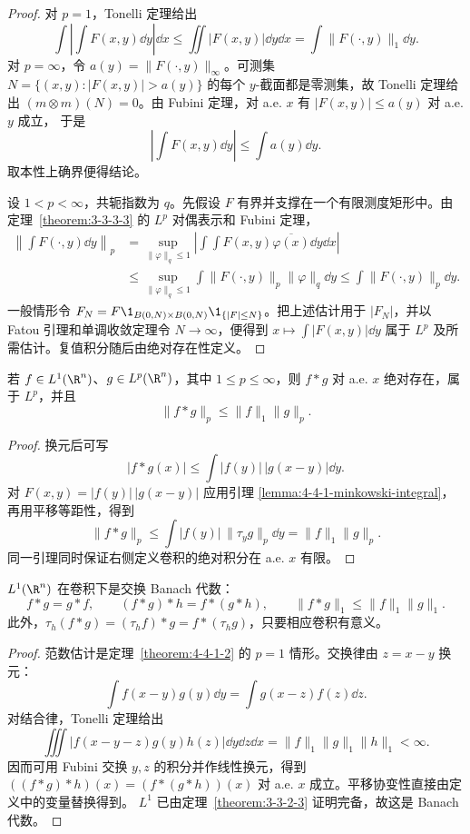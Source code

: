 \begin{proof}
对 $p=1$，Tonelli 定理给出
\[
 \int\left|\int F(x,y)\dd y\right|\dd x
 \le\iint|F(x,y)|\dd y\dd x
 =\int\|F(\cdot,y)\|_1\dd y.
\]
对 $p=\infty$，令 $a(y)=\|F(\cdot,y)\|_\infty$。可测集
$N=\{(x,y):|F(x,y)|>a(y)\}$ 的每个 $y$-截面都是零测集，故 Tonelli 定理给出
$(m\otimes m)(N)=0$。由 Fubini 定理，对 a.e. $x$ 有 $|F(x,y)|\le a(y)$ 对 a.e. $y$ 成立，
于是
\[
 \left|\int F(x,y)\dd y\right|\le\int a(y)\dd y.
\]
取本性上确界便得结论。

设 $1<p<\infty$，共轭指数为 $q$。先假设 $F$ 有界并支撑在一个有限测度矩形中。由
定理~\ref{theorem:3-3-3-3} 的 $L^p$ 对偶表示和 Fubini 定理，
\begin{align*}
 \left\|\int F(\cdot,y)\dd y\right\|_p
 &=\sup_{\|\varphi\|_q\le1}
 \left|\int\!\int F(x,y)\overline{\varphi(x)}\dd y\dd x\right|\\
 &\le\sup_{\|\varphi\|_q\le1}
 \int\|F(\cdot,y)\|_p\|\varphi\|_q\dd y
 \le\int\|F(\cdot,y)\|_p\dd y.
\end{align*}
一般情形令
$F_N=F\1_{B(0,N)\times B(0,N)}\1_{\{|F|\le N\}}$。把上述估计用于
$|F_N|$，并以 Fatou 引理和单调收敛定理令 $N\to\infty$，便得到
$x\mapsto\int|F(x,y)|\dd y$ 属于 $L^p$ 及所需估计。复值积分随后由绝对存在性定义。
\end{proof}

\begin{theorem}\label{theorem:4-4-1-2}
若 $f\in L^1(\R^n)$、$g\in L^p(\R^n)$，其中 $1\le p\le\infty$，则
$f*g$ 对 a.e. $x$ 绝对存在，属于 $L^p$，并且
\[
 \|f*g\|_p\le\|f\|_1\|g\|_p.
\]
\end{theorem}

\begin{proof}
换元后可写
\[
 |f*g(x)|\le\int|f(y)|\,|g(x-y)|\dd y.
\]
对 $F(x,y)=|f(y)|\,|g(x-y)|$ 应用引理
\ref{lemma:4-4-1-minkowski-integral}，再用平移等距性，得到
\[
 \|f*g\|_p
 \le\int|f(y)|\,\|\tau_yg\|_p\dd y
 =\|f\|_1\|g\|_p.
\]
同一引理同时保证右侧定义卷积的绝对积分在 a.e. $x$ 有限。
\end{proof}

\begin{proposition}[卷积代数]\label{proposition:4-4-1-3}
$L^1(\R^n)$ 在卷积下是交换 Banach 代数：
\[
 f*g=g*f,\qquad (f*g)*h=f*(g*h),\qquad
 \|f*g\|_1\le\|f\|_1\|g\|_1.
\]
此外，$\tau_h(f*g)=(\tau_hf)*g=f*(\tau_hg)$，只要相应卷积有意义。
\end{proposition}

\begin{proof}
范数估计是定理~\ref{theorem:4-4-1-2} 的 $p=1$ 情形。交换律由 $z=x-y$ 换元：
\[
 \int f(x-y)g(y)\dd y=\int g(x-z)f(z)\dd z.
\]
对结合律，Tonelli 定理给出
\[
 \iiint |f(x-y-z)g(y)h(z)|\dd y\dd z\dd x
 =\|f\|_1\|g\|_1\|h\|_1<\infty.
\]
因而可用 Fubini 交换 $y,z$ 的积分并作线性换元，得到
$((f*g)*h)(x)=(f*(g*h))(x)$ 对 a.e. $x$ 成立。平移协变性直接由定义中的变量替换得到。
$L^1$ 已由定理~\ref{theorem:3-3-2-3} 证明完备，故这是 Banach 代数。
\end{proof}

